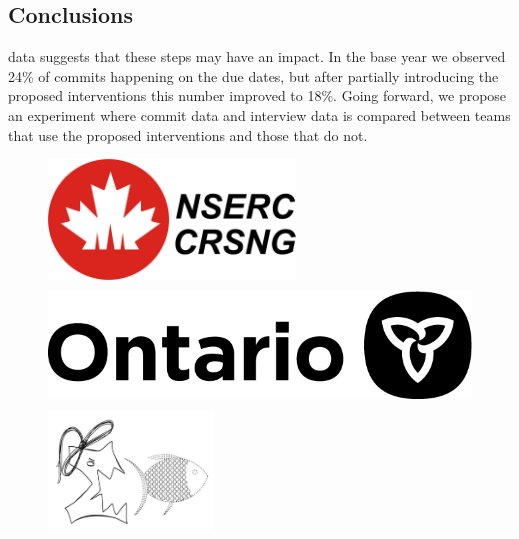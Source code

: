 \documentclass[poster, a1, plainboxedsections]{sciposter}
\begin{document}
\begin{multicols}{2}
\section{Conclusions}

 data suggests that these steps may have an impact.  In
the base year we observed 24\% of commits happening on the due dates, but after
partially introducing the proposed interventions this number improved to 18\%.
Going forward, we propose an experiment where commit data and interview data is
compared between teams that use the proposed interventions and those that do
not.

\begin{figure}[htbp]
  \centering
  \includegraphics[height=3.2cm,trim={0 0 28.5cm 0},clip]{nserc-logo.jpg}
  \hspace{0.5cm}
  \includegraphics[height=3.2cm,trim={16.5cm 0 0 0},clip]{ontario@2x-print.png}
  \hspace{0.5cm}
  \includegraphics[height=3.2cm,trim={0 0.5cm 0 0.48cm},clip]{outreachlogo.png}  
\end{figure}
  
\end{multicols}
\end{document}
